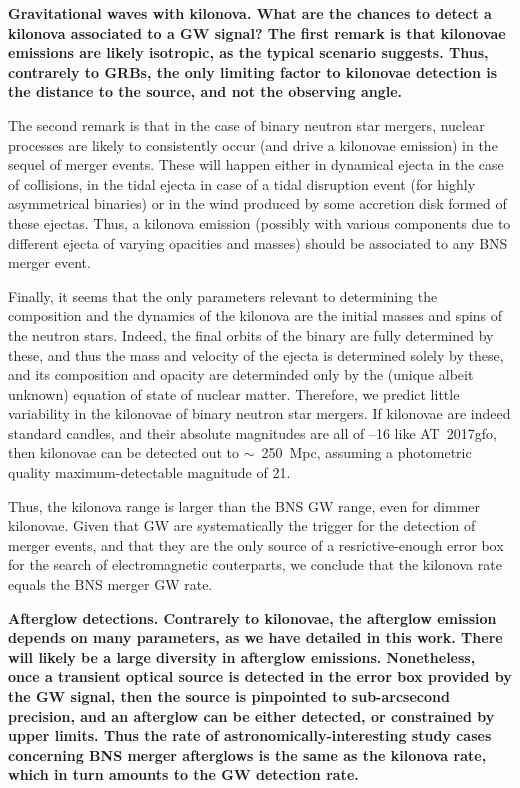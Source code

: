 \bf{Gravitational waves with kilonova. }What are the chances to detect a kilonova associated to a GW signal? The first remark is that kilonovae emissions are likely isotropic, as the typical scenario suggests. Thus, contrarely to GRBs, the only limiting factor to kilonovae detection is the distance to the source, and not the observing angle.

The second remark is that in the case of binary neutron star mergers, nuclear processes are likely to consistently occur (and drive a kilonovae emission) in the sequel of merger events. These will happen either in dynamical ejecta in the case of collisions, in the tidal ejecta in case of a tidal disruption event (for highly asymmetrical binaries) or in the wind produced by some accretion disk formed of these ejectas. Thus, a kilonova emission (possibly with various components due to different ejecta of varying opacities and masses) should be associated to any BNS merger event.

Finally, it seems that the only parameters relevant to determining the composition and the dynamics of the kilonova are the initial masses and spins of the neutron stars. Indeed, the final orbits of the binary are fully determined by these, and thus the mass and velocity of the ejecta is determined solely by these, and its composition and opacity are determinded only by the (unique albeit unknown) equation of state of nuclear matter. Therefore, we predict little variability in the kilonovae of binary neutron star mergers. If kilonovae are indeed standard candles, and their absolute magnitudes are all of --16 like AT~2017gfo, then kilonovae can be detected out to $\sim$~250~Mpc, assuming a photometric quality maximum-detectable magnitude of 21.

Thus, the kilonova range is larger than the BNS GW range, even for dimmer kilonovae. Given that GW are systematically the trigger for the detection of merger events, and that they are the only source of a resrictive-enough error box for the search of electromagnetic couterparts, we conclude that the kilonova rate equals the BNS merger GW rate.

\bf{Afterglow detections. }Contrarely to kilonovae, the afterglow emission depends on many parameters, as we have detailed in this work. There will likely be a large diversity in afterglow emissions. Nonetheless, once a transient optical source is detected in the error box provided by the GW signal, then the source is pinpointed to sub-arcsecond precision, and an afterglow can be either detected, or constrained by upper limits. Thus the rate of astronomically-interesting study cases concerning BNS merger afterglows is the same as the kilonova rate, which in turn amounts to the GW detection rate.


